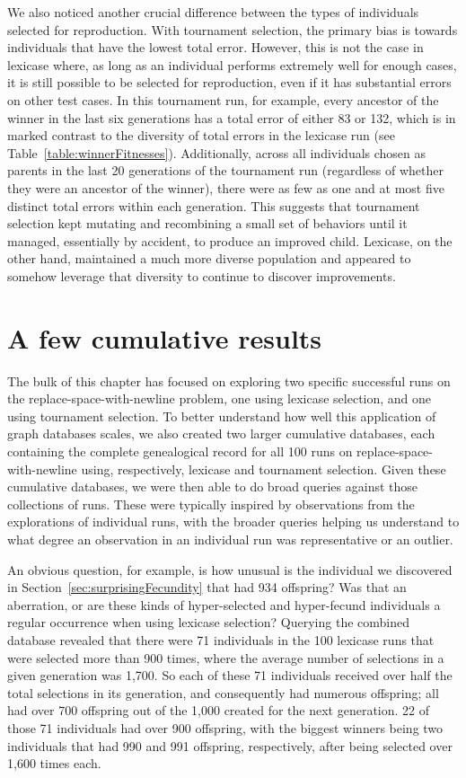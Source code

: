We also noticed another crucial difference between the types of individuals 
selected for reproduction. With tournament selection, the primary bias is towards individuals that 
have the lowest total error. However, this is not the case in lexicase where, as long as an individual 
performs extremely well for enough cases, it is still possible to be selected for 
reproduction, even if it has substantial errors on other test cases.
In this tournament run, for example, every ancestor of the winner in the
last six generations
has a total error of either 83 or 132, which is in marked contrast to the diversity of total errors
in the lexicase run (see Table~\ref{table:winnerFitnesses}). Additionally, across all individuals chosen
as parents in the last 20 generations of the tournament run (regardless of whether they were an ancestor of the winner), 
there were as few as one and at most five distinct total errors within each generation. 
This suggests that tournament selection kept
mutating and recombining a small set of behaviors until it managed, essentially by accident, to produce an improved 
child. Lexicase, on the other hand, maintained a much more diverse population and appeared to somehow leverage that
diversity to continue to discover improvements.

\section{A few cumulative results}
\label{sec:cumulativeResults}

The bulk of this chapter has focused on exploring two specific successful runs on the replace-space-with-newline problem,
one using lexicase selection, and one using tournament selection. To better understand how well this application of graph
databases scales, we also created two larger cumulative databases, each containing the complete genealogical record for all 
100 runs on replace-space-with-newline using, respectively, lexicase and tournament selection. Given these cumulative 
databases, we were then able to do broad queries against those collections of runs. These were typically inspired by 
observations from the explorations of individual runs, with the broader queries helping us understand to what degree an 
observation in an individual run was representative or an outlier.

An obvious question, for example, is how unusual is the individual we discovered in Section~\ref{sec:surprisingFecundity} 
that had 934 offspring? Was that an aberration, or are these kinds of hyper-selected and hyper-fecund individuals a
regular occurrence when using lexicase selection? Querying the combined database revealed that there were 71 individuals
in the 100 lexicase runs that were selected more than 900 times, where the average number of selections in a given 
generation was 1,700. So each of these 71 individuals received over half the total selections in its generation, and 
consequently had numerous offspring; all had over 700 offspring out of the 1,000 created for the next generation. 22 of
those 71 individuals had over 900 offspring, with the biggest winners being two individuals that had 990 and 991 
offspring, respectively, after being selected over 1,600 times each. 

